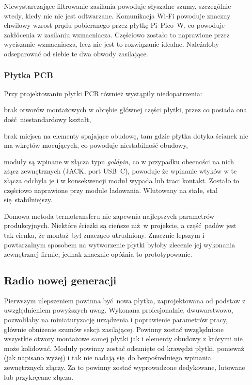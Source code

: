 \documentclass[polish]{aghengthesis}
\let\tempone\itemize
\let\temptwo\enditemize
\renewenvironment{itemize}{\tempone\setlength{\itemsep}{0cm}}{\temptwo}
\begin{document}
				Niewystarczające filtrowanie zasilania powoduje słyszalne szumy, szczególnie wtedy, kiedy nic nie jest odtwarzane. Komunikacja Wi-Fi powoduje znaczny chwilowy wzrost prądu pobieranego przez płytkę Pi~Pico~W, co powoduje zakłócenia w zasilaniu wzmacniacza. Częściowo zostało to naprawione przez wyciszanie wzmacniacza, lecz nie jest to rozwiązanie idealne. Należałoby odseparować od siebie te dwa obwody zasilające.
				
			\subsubsection{Płytka PCB}
				Przy projektowaniu płytki PCB również wystąpiły niedopatrzenia:
				\begin{itemize}
					\item brak otworów montażowych w obrębie głównej części płytki, przez co posiada ona dość niestandardowy kształt,
					\item brak miejsca na elementy spajające obudowę, tam gdzie płytka dotyka ścianek nie ma wkrętów mocujących, co powoduje niestabilność obudowy,
					\item moduły są wpinane w złącza typu \textit{goldpin}, co w przypadku obecności na nich złącz zewnętrznych (JACK, port USB~C), powoduje że wpinanie wtyków w te złącza odchyla je i w konsekwencji moduł wypada lub traci kontakt. Zostało to częściowo naprawione przy module ładowania. Wlutowany na stałe, stał się stabilniejszy.
				\end{itemize}
				
				Domowa metoda termotransferu nie zapewnia najlepszych parametrów produkcyjnych. Niektóre ścieżki są cieńsze niż w projekcie, a część padów jest tak cienka, że montaż był znacząco utrudniony. Znacznie lepszym i powtarzalnym sposobem na wytworzenie płytki byłoby zlecenie jej wykonania zewnętrznej firmie, jednak znacznie opóźnia to prototypowanie.
		
		\subsection{Radio nowej generacji}
			Pierwszym ulepszeniem powinna być nowa płytka, zaprojektowana od podstaw z uwzględnieniem powyższych uwag. Wykonana profesjonalnie, dwuwarstwowo, pozwoliłaby na miniaturyzację urządzenia i poprawienie parametrów pracy, głównie obniżenie szumów sekcji zasilającej. Powinny zostać uwzględnione wszystkie otwory montażowe samej płytki jak i elementy obudowy z którymi nie może kolidować. Moduły powinny zostać odsunięte od krawędzi płytki, ponieważ (jak napisano wyżej) i tak nie nadają się do bezpośredniego wpinania zewnętrznych złączy. Za to powinny zostać wyprowadzone dedykowane, lutowane lub przykręcane złącza.
			$ $\\
\end{document}
